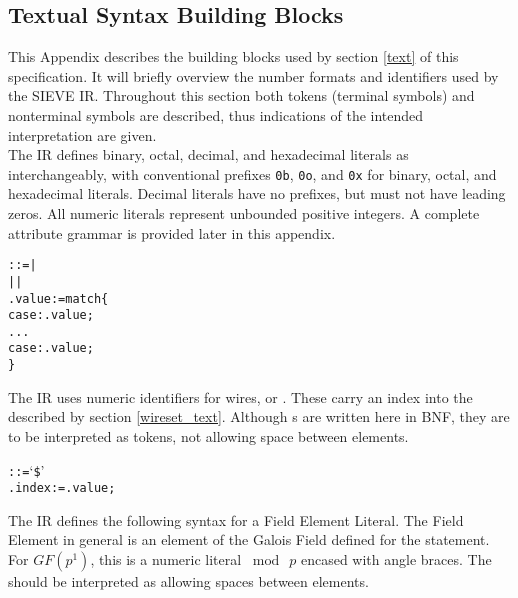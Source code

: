 
\newpage
\begin{appendices}
\section{Textual Syntax Building Blocks}\label{textblocks}

This Appendix describes the building blocks used by section \ref{text} of this specification.
It will briefly overview the number formats and identifiers used by the SIEVE IR.
Throughout this section both tokens (terminal symbols) and nonterminal symbols are described, thus indications of the intended interpretation are given.\\

The IR defines binary, octal, decimal, and hexadecimal literals as interchangeably, with conventional prefixes \texttt{0b}, \texttt{0o}, and \texttt{0x} for binary, octal, and hexadecimal literals.
Decimal literals have no prefixes, but must not have leading zeros.
All numeric literals represent unbounded positive integers.
A complete attribute grammar is provided later in this appendix.\\

\begin{alltt}\ttSyn
   ::=  | 
                      |  | \ttSem
    .value := match \{
      case : .value;
      ...
      case : .value;
    \}
\end{alltt}

The IR uses numeric identifiers for wires, or .
These carry an index into the   described by section \ref{wireset_text}.
Although s are written here in BNF, they are to be interpreted as tokens, not allowing space between elements.\\

\begin{alltt}\ttSyn
   ::= `\$' \ttSem
    .index := .value;
\end{alltt}

The IR defines the following syntax for a Field Element Literal.
The Field Element in general is an element of the Galois Field defined for the statement.
For $GF(p^1)$, this is a numeric literal $\bmod\ p$ encased with angle braces.
The  should be interpreted as allowing spaces between elements. \\


\end{appendices}
